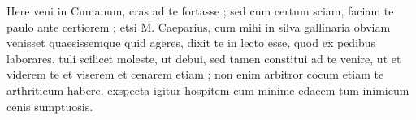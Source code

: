 


 Here veni in Cumanum, cras ad te fortasse ; sed cum certum sciam, faciam te paulo ante certiorem ; etsi M. Caeparius, cum mihi in silva gallinaria obviam venisset quaesissemque quid ageres, dixit te in lecto esse, quod ex pedibus laborares. tuli scilicet moleste, ut debui, sed tamen constitui ad te venire, ut et viderem te et viserem et cenarem etiam ; non enim arbitror cocum etiam te arthriticum habere. exspecta igitur hospitem cum minime edacem tum inimicum cenis sumptuosis.
